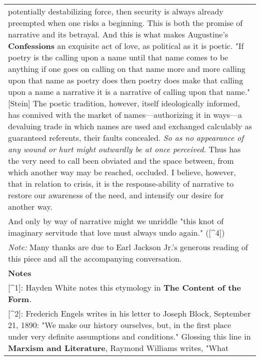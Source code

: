 \begin{longtable}[]{@{}l@{}}
\begin{minipage}[t]{0.97\columnwidth}
potentially destabilizing force, then security is always already
preempted when one risks a beginning. This is both the promise of
narrative and its betrayal. And this is what makes Augustine's
\textbf{Confessions} an exquisite act of love, as political as it is
poetic. "If poetry is the calling upon a name until that name comes to
be anything if one goes on calling on that name more and more calling
upon that name as poetry does then poetry does make that calling upon a
name a narrative it is a narrative of calling upon that name."
{[}Stein{]} The poetic tradition, however, itself ideologically
informed, has connived with the market of names---authorizing it in
ways---a devaluing trade in which names are used and exchanged
calculably as guaranteed referents, their faults concealed. \emph{So as
no appearance of any wound or hurt might outwardly be at once
perceived.} Thus has the very need to call been obviated and the space
between, from which another way may be reached, occluded. I believe,
however, that in relation to crisis, it is the response-ability of
narrative to restore our awareness of the need, and intensify our desire
for another way.\strut
\end{minipage}\tabularnewline
\begin{minipage}[t]{0.97\columnwidth}\raggedright
And only by way of narrative might we unriddle "this knot of imaginary
servitude that love must always undo again." ({[}\^{}4{]})\strut
\end{minipage}\tabularnewline
\begin{minipage}[t]{0.97\columnwidth}\raggedright
\emph{Note:} Many thanks are due to Earl Jackson Jr.'s generous reading
of this piece and all the accompanying conversation.\strut
\end{minipage}\tabularnewline
\begin{minipage}[t]{0.97\columnwidth}\raggedright
\textbf{Notes}\strut
\end{minipage}\tabularnewline
\begin{minipage}[t]{0.97\columnwidth}\raggedright
{[}\^{}1{]}: Hayden White notes this etymology in \textbf{The Content of
the Form}\emph{.}\strut
\end{minipage}\tabularnewline
\begin{minipage}[t]{0.97\columnwidth}\raggedright
{[}\^{}2{]}: Frederich Engels writes in his letter to Joseph Block,
September 21, 1890: "We make our history ourselves, but, in the first
place under very definite assumptions and conditions." Glossing this
line in \textbf{Marxism and Literature}, Raymond Williams writes, "What

\end{minipage}
\end{longtable}
